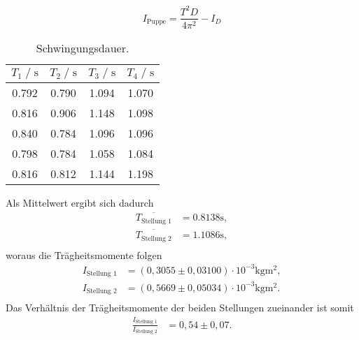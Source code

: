 
\begin{equation*}
  I_{\text{Puppe}} = \frac{T^2D}{4\pi^2} - I_D
\end{equation*}

\begin{table}[H]
    \centering
        \caption{Schwingungsdauer.}
        \label{tab:schwingdauer}
        \begin{tabular}{c c c c}
        \toprule
        $T_1 \;/\; \si{\second}$ & $T_2 \;/\; \si{\second}$ & $T_3 \;/\; \si{\second}$ & $T_4 \;/\; \si{\second}$ \\
        \midrule
        0.792 & 0.790 & 1.094 & 1.070 \\
        0.816 & 0.906 & 1.148 & 1.098 \\
        0.840 & 0.784 & 1.096 & 1.096 \\
        0.798 & 0.784 & 1.058 & 1.084 \\
        0.816 & 0.812 & 1.144 & 1.198 \\
        \bottomrule
    \end{tabular}
\end{table}


Als Mittelwert ergibt sich dadurch
\begin{align*}
  \overline{T_{\text{Stellung 1}}} &= 0.8138 \si{\second}, \\
  \overline{T_{\text{Stellung 2}}} &= 1.1086 \si{\second}, \\
\end{align*}
woraus die Trägheitsmomente folgen %
\begin{align*}
  I_{\text{Stellung 1}} &= (0,3055\pm 0,03100) \cdot 10^{-3} \si{\kilogram\meter^2}, \\
  I_{\text{Stellung 2}} &= (0,5669\pm 0,05034) \cdot 10^{-3} \si{\kilogram\meter^2}. \\
\end{align*}
Das Verhältnis der Trägheitsmomente der beiden Stellungen zueinander ist somit
\begin{align*}
  \frac{I_{\text{Stellung 1}}}{I_{\text{Stellung 2}}} &= 0,54\pm 0,07.  \\
\end{align*}


